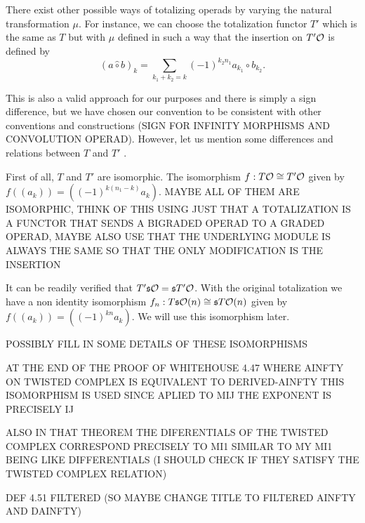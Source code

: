 \documentclass[twoside]{article}
\begin{document}
\begin{remark}
There exist other possible ways of totalizing operads by varying the natural transformation $\mu$. For instance, we can choose the totalization functor $T'$ which is the same as $T$ but  with $\mu$ defined in such a way that the insertion on $T'{\mathcal O}$ is defined by \[(a\hat{\circ}b)_k=\sum_{k_1+k_2=k}(-1)^{k_2n_1}a_{k_1}\circ b_{k_2}.\] 

This is also a valid approach for our purposes and there is simply a sign difference, but we have chosen our convention to be consistent with other conventions and constructions (SIGN FOR INFINITY MORPHISMS AND CONVOLUTION OPERAD). However, let us mention some differences and relations between $T$ and $T'$ . %

First of all, $T$ and $T'$ are isomorphic. The isomorphism $f:T{\mathcal O}\cong T'{\mathcal O}$ given by $f((a_k))=((-1)^{k(n_1-k)}a_k)$. MAYBE ALL OF THEM ARE ISOMORPHIC, THINK OF THIS USING JUST THAT A TOTALIZATION IS A FUNCTOR THAT SENDS A BIGRADED OPERAD TO A GRADED OPERAD, MAYBE ALSO USE THAT THE UNDERLYING MODULE IS ALWAYS THE SAME SO THAT THE ONLY MODIFICATION IS THE INSERTION

It can be readily verified that $T'\mathfrak{s}{\mathcal O}=\mathfrak{s} T'{\mathcal O}$. With the original totalization we have a non identity isomorphism $f_n:T\mathfrak{s}{\mathcal O}(n)\cong\mathfrak{s} T{\mathcal O}(n)$ given by $f((a_k))=((-1)^{kn}a_k)$. We will use this isomorphism later.

POSSIBLY FILL IN SOME DETAILS OF THESE ISOMORPHISMS

AT THE END  OF THE PROOF OF WHITEHOUSE 4.47 WHERE AINFTY ON TWISTED COMPLEX IS EQUIVALENT TO DERIVED-AINFTY THIS ISOMORPHISM IS  USED SINCE APLIED TO MIJ  THE EXPONENT IS PRECISELY IJ

ALSO IN THAT THEOREM THE DIFERENTIALS OF THE TWISTED COMPLEX CORRESPOND PRECISELY TO MI1 SIMILAR TO MY MI1 BEING LIKE DIFFERENTIALS (I SHOULD CHECK IF THEY SATISFY THE TWISTED COMPLEX RELATION)


DEF 4.51 FILTERED (SO MAYBE CHANGE TITLE TO FILTERED AINFTY AND DAINFTY)
\end{remark}
\end{document}
